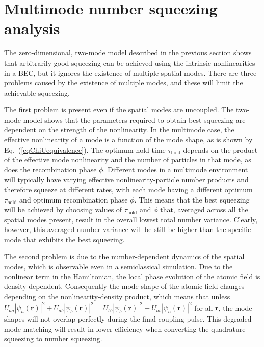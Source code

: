 \documentclass{iopart}
\begin{document}
\section{Multimode number squeezing analysis} \label{sec:MMdescription}

The zero-dimensional, two-mode model described in the previous section shows that arbitrarily good squeezing can be achieved using the intrinsic nonlinearities in a BEC, but it ignores the existence of multiple spatial modes.  There are three problems caused by the existence of multiple modes, and these will limit the achievable squeezing.

The first problem is present even if the spatial modes are uncoupled.  The two-mode model shows that the parameters required to obtain best squeezing are dependent on the strength of the nonlinearity. In the multimode case, the effective nonlinearity of a mode is a function of the mode shape, as is shown by Eq.~(\ref{eqChiUequivalence}). The optimum hold time $\tau_{\mathrm{hold}}$ depends on the product of the effective mode nonlinearity and the number of particles in that mode, as does the recombination phase $\phi$.  Different modes in a multimode environment will typically have varying effective nonlinearity-particle number products and therefore squeeze at different rates, with each mode having a different optimum $\tau_{\mathrm{hold}}$ and optimum recombination phase $\phi$. This means that the best squeezing will be achieved by choosing values of $\tau_{\mathrm{hold}}$ and $\phi$ that, averaged across all the spatial modes present, result in the overall lowest total number variance. Clearly, however, this averaged number variance will be still be higher than the specific mode that exhibits the best squeezing.

The second problem is due to the number-dependent dynamics of the spatial modes, which is observable even in a semiclassical simulation.  Due to the nonlinear term in the Hamiltonian, the local phase evolution of the atomic field is density dependent.  Consequently the mode shape of the atomic field changes depending on the nonlinearity-density product, which means that unless $U_{aa}|\psi_a({\mathbf{r}})|^2 + U_{ab}|\psi_b({\mathbf{r}})|^2 = U_{bb}|\psi_b({\mathbf{r}})|^2 + U_{ab}|\psi_a({\mathbf{r}})|^2$ for all ${\mathbf{r}}$, the mode shapes will not overlap perfectly during the final coupling pulse. This degraded mode-matching will result in lower efficiency when converting the quadrature squeezing to number squeezing. 
\end{document}
